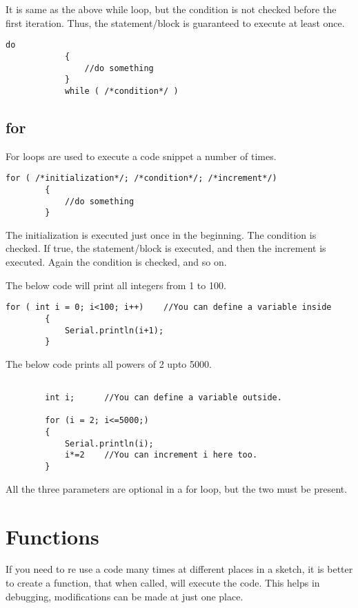 \documentclass{article}
\begin{document}
			It is same as the above while loop, but the condition is not checked before the first iteration. Thus, the statement/block is guaranteed to execute at least once.

			\begin{lstlisting}[gobble=12]
			do
			{
				//do something
			}
			while ( /*condition*/ )
			\end{lstlisting}

	\subsection{for}

		For loops are used to execute a code snippet a number of times.

		\begin{lstlisting}[gobble=8]
		for ( /*initialization*/; /*condition*/; /*increment*/)
		{
			//do something
		}
		\end{lstlisting}

		The initialization is executed just once in the beginning. The condition is checked. If true, the statement/block is executed, and then the increment is executed. Again the condition is checked, and so on.

		The below code will print all integers from 1 to 100.

		\begin{lstlisting}[gobble=8]
		for ( int i = 0; i<100; i++)	//You can define a variable inside
		{
			Serial.println(i+1);
		}
		\end{lstlisting}

		The below code prints all powers of 2 upto 5000.

		\begin{lstlisting}[gobble=8]

		int i; 		//You can define a variable outside.

		for (i = 2; i<=5000;)
		{
			Serial.println(i);
			i*=2	//You can increment i here too.
		}
		\end{lstlisting}

		All the three parameters are optional in a for loop, but the two \inlncd{;} must be present.

\section{Functions}
	
	If you need to re use a code many times at different places in a sketch, it is better to create a function, that when called, will execute the code. This helps in debugging, modifications can be made at just one place.
\end{document}
